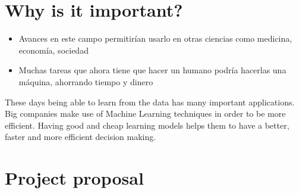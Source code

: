 
\section{Why is it important?}

\begin{note}
  \begin{itemize}
    \item Avances en este campo permitirían usarlo en otras ciencias como medicina,
    economía, sociedad
    \item Muchas tareas que ahora tiene que hacer un humano podría hacerlas una
    máquina, ahorrando tiempo y dinero
  \end{itemize}
\end{note}

\begin{pre-delivery}
  These days being able to learn from the data has many important applications.
  Big companies make use of Machine Learning techniques in order to be more
  efficient. Having good and cheap learning models helps them to have a
  better, faster and more efficient decision making.


\end{pre-delivery}



\section{Project proposal}

